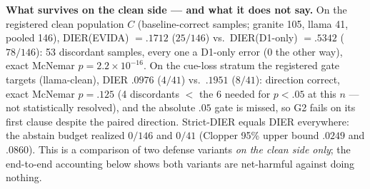 \documentclass[sigconf,nonacm]{acmart}
\begin{document}
\textbf{What survives on the clean side --- and what it does not say.} On
the registered clean population $C$ (baseline-correct samples; granite
105, llama 41, pooled 146), DIER(EVIDA) $=.1712$ ($25/146$) vs.\
DIER(D1-only) $=.5342$ ($78/146$): 53 discordant samples, every one a
D1-only error (0 the other way), exact McNemar $p{=}2.2{\times}10^{-16}$.
On the cue-loss stratum the registered gate targets (llama-clean), DIER
$.0976$ ($4/41$) vs.\ $.1951$ ($8/41$): direction correct, exact McNemar
$p{=}.125$ (4 discordants $<$ the 6 needed for $p{<}.05$ at this $n$ ---
not statistically resolved), and the absolute $.05$ gate is missed, so
G2 fails on its first clause despite the paired direction. Strict-DIER
equals DIER everywhere: the abstain budget realized $0/146$ and $0/41$
(Clopper 95\% upper bound $.0249$ and $.0860$). This is a comparison of
two defense variants \emph{on the clean side only}; the end-to-end
accounting below shows both variants are net-harmful against doing
nothing.
\end{document}
